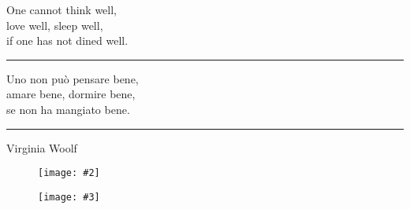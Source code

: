     \NewDocumentCommand \DedicationVerso{}
    {
        \begin{center}
            {\FontChapterTitle
                One cannot think well, \\
                love well, sleep well, \\
                if one has not dined well.\\
                \vspace{5pt}
                \hrule
                \vspace{5pt}
                Uno non pu\`o pensare bene, \\
                amare bene, dormire bene, \\
                se  non ha mangiato bene. \\
                \vspace{5pt}
                \hrule
                \vspace{5pt}
                Virginia Woolf
            }
        \end{center}
    }
\fi

\graphicspath{{images/}{../images/}} %
\usepackage[skip=2pt, labelformat=empty, font={rm,it}]{caption} %
\captionsetup{justification=centering} %


\NewDocumentCommand {} %
{
    \begin{figure}[htb]
        \centering
        \begin{minipage}[\VerticalAlign]{0.49\textwidth} %
            \centering
            \texttt{[image: \#2]} %
            \ifx\LeftText\empty\relax\else\caption{\LeftText}\fi
        \end{minipage}\hfill%
        \begin{minipage}[\VerticalAlign]{0.49\textwidth}
            \centering
            \texttt{[image: \#3]} %
            \ifx\RightText\empty\relax\else\caption{\RightText}\fi
        \end{minipage}
    \end{figure}
}

